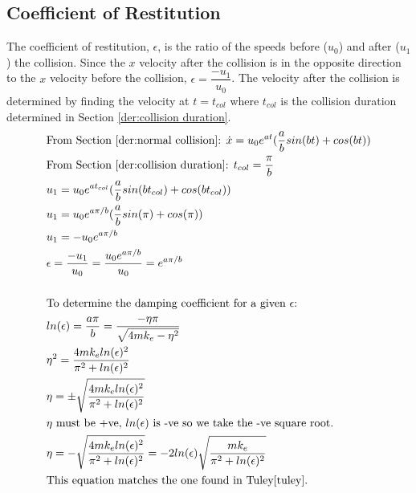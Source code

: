 \documentclass[a4paper,11pt,titlepage]{report}
\begin{document}
\subsection{Coefficient of Restitution}
\label{der:coefficient of restitution}
The coefficient of restitution, $\epsilon$, is the ratio of the speeds before ($u_0$) and after ($u_1$) the collision. Since the $x$ velocity after the collision is in the opposite direction to the $x$ velocity before the collision, $\epsilon = \dfrac{- u_1}{u_0}$. The velocity after the collision is determined by finding the velocity at $t = t_{col}$ where $t_{col}$ is the collision duration determined in Section \ref{der:collision duration}.
\begin{align*}
&\text{From Section \ref{der:normal collision}: } \dot{x} = u_0 e^{at} (\dfrac{a}{b} sin(bt) + cos(bt)) \\
&\text{From Section \ref{der:collision duration}: } t_{col} = \dfrac{\pi}{b} \\
&u_1 = u_0 e^{at_{col}} (\dfrac{a}{b} sin(bt_{col}) + cos(bt_{col})) \\
&u_1 = u_0 e^{a \pi / b} (\dfrac{a}{b} sin(\pi) + cos(\pi)) \\
&u_1 = - u_0 e^{a \pi / b} \\
&\epsilon = \dfrac{- u_1}{u_0} = \dfrac{u_0 e^{a \pi / b}}{u_0} = e^{a \pi / b} \\\\
&\text{To determine the damping coefficient for a given $\epsilon$:} \\
&ln(\epsilon) = \dfrac{a \pi}{b} = \dfrac{- \eta \pi}{\sqrt{4 m k_e - \eta^2}} \\
&\eta^2 = \dfrac{4 m k_e ln(\epsilon)^2}{\pi^2 + ln(\epsilon)^2} \\
&\eta = \pm \sqrt{\dfrac{4 m k_e ln(\epsilon)^2}{\pi^2 + ln(\epsilon)^2}} \\
&\text{$\eta$ must be +ve, $ln(\epsilon)$ is -ve so we take the -ve square root.} \\
&\eta = - \sqrt{\dfrac{4 m k_e ln(\epsilon)^2}{\pi^2 + ln(\epsilon)^2}} 
 = - 2 ln(\epsilon) \sqrt{\dfrac{m k_e}{\pi^2 + ln(\epsilon)^2}} \\
&\text{This equation matches the one found in Tuley\cite{tuley}.}
\end{align*}
\end{document}
